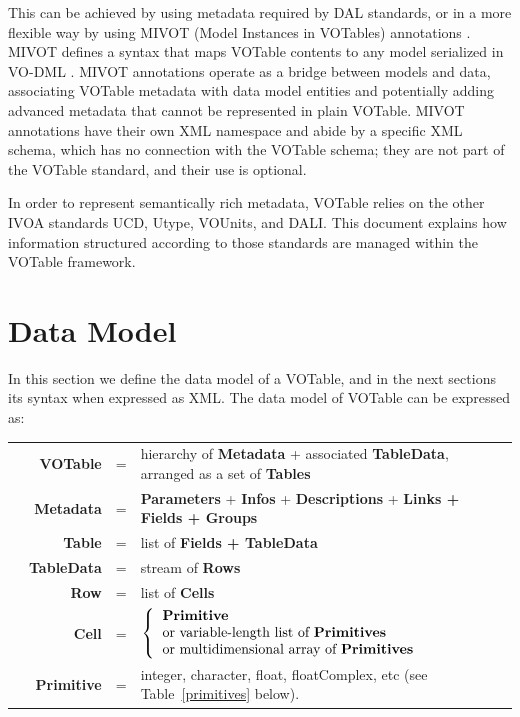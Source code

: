 \documentclass[11pt,a4paper]{ivoa}
\def\Tref#1{Table~\ref{#1}}
\let\fg=\color
\begin{document}
This can be achieved by using metadata required by DAL standards,
or in a more flexible way by using MIVOT (Model Instances in VOTables) annotations \citep{2023ivoa.spec.0620M}.
MIVOT defines a syntax that maps VOTable contents to any model serialized in VO-DML \citep{2018ivoa.spec.0910L}.
MIVOT annotations operate as a bridge between models and data, associating VOTable metadata
with data model entities and potentially adding advanced metadata that cannot be represented in plain VOTable.
MIVOT annotations have their own XML namespace and abide by a specific XML schema,
which has no connection with the VOTable schema; they are not part of the VOTable standard,
and their use is optional.

In order to represent semantically rich metadata, VOTable relies on
the other IVOA standards UCD, Utype, VOUnits, and DALI.
This document explains how information structured according to those
standards are managed within the VOTable framework.


\section{Data Model}

In this section we define the data model of a VOTable, and in the
next sections its syntax when expressed as XML. The data model of
VOTable can be expressed as:

\medskip
\begin{tabular}{rrcp{}}
\hspace{3em}&{\bf VOTable} &=& hierarchy of {\bf Metadata} + associated
        {\bf TableData}, arranged as a set of {\bf Tables}\\
&{\bf Metadata} &=& {\bf Parameters} + {\bf Infos} + {\bf Descriptions}
                + {\bf {\fg{black}Links + Fields + Groups}}\\
&{\bf Table} &=& list of {\bf Fields + TableData}\\
&{\bf TableData}{ } &=& stream of {\bf Rows}\\
&{\bf Row} &=& list of {\bf Cells}\\
&{\bf Cell} &=&
        $\left\{
        \begin{tabular}{l}
         {\bf Primitive} \\
        or variable-length list of {\bf Primitives} \\
        or multidimensional array of {\bf Primitives}\\
        \end{tabular}
        \right.$
        \\
&{\bf Primitive} &=& integer, character, float, floatComplex, etc
(see \Tref{primitives} below).
\end{tabular}
\end{document}
